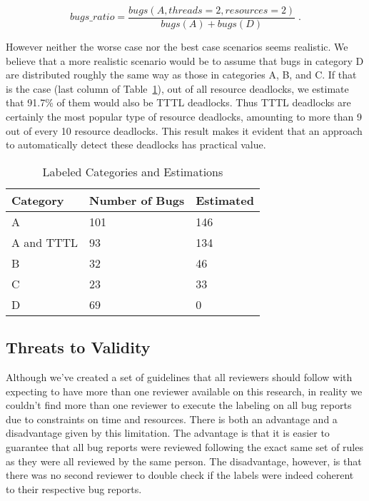 \begin{equation}\label{eq:worse}
bugs\_ratio = \frac{ bugs(A, threads=2, resources=2) }{ bugs(A) + bugs(D) } \; .
\end{equation}

However neither the worse case nor the best case scenarios seems realistic. We believe that a more realistic scenario would be to assume that bugs in category D are distributed roughly the same way as those in categories A, B, and C. If that is the case (last column of Table~\ref{tab:categ}), out of all resource deadlocks, we estimate that 91.7\% of them would also be TTTL deadlocks. Thus TTTL deadlocks are certainly the most popular type of resource deadlocks, amounting to more than 9 out of every 10 resource deadlocks. This result makes it evident that an approach to automatically detect these deadlocks has practical value.

\begin{table}
\begin{center}
\caption{Labeled Categories and Estimations}\label{tab:categ}
\begin{tabular}{|l|l|l|}
\hline
Category & Number of Bugs & Estimated \\
\hline
A & 101 & 146 \\
A and TTTL & 93 & 134  \\
B & 32 & 46 \\
C & 23 & 33 \\
D & 69 & 0 \\
\hline
\end{tabular}
\end{center}
\end{table}

\subsection{Threats to Validity}

Although we've created a set of guidelines that all reviewers should follow with expecting to have more than one reviewer available on this research,
in reality we couldn't find more than one reviewer to execute the labeling on all bug reports due to constraints on time and resources. There is both an advantage
and a disadvantage given by this limitation. The advantage is that it is easier to guarantee that all bug reports were reviewed following the exact same set of rules
as they were all reviewed by the same person. The disadvantage, however, is that there was no second reviewer to double check if the labels
were indeed coherent to their respective bug reports.

